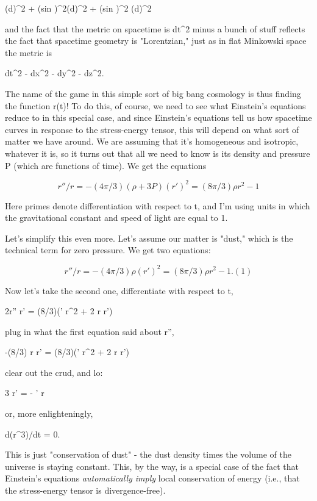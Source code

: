 (d\psi )^{2} + (sin \psi )^{2}{(d\theta )^{2} + (sin \theta )^{2} (d\phi )^{2}}

and the fact that the metric on spacetime is dt^{2} minus a bunch of stuff
reflects the fact that spacetime geometry is "Lorentzian," just as
in flat Minkowski space the metric is

dt^{2} - dx^{2} - dy^{2} - dz^{2}.

The name of the game in this simple sort of big bang cosmology is thus
finding the function r(t)!  To do this, of course, we need to see what
Einstein's equations reduce to in this special case, and since
Einstein's equations tell us how spacetime curves in response to the
stress-energy tensor, this will depend on what sort of matter we have
around.  We are assuming that it's homogeneous and isotropic, whatever
it is, so it turns out that all we need to know is its density \rho  and
pressure P (which are functions of time).  We get the equations


$$

r''/r = -(4\pi /3)(\rho  + 3P)              (r')^{2} = (8\pi /3) \rho  r^{2} - 1 
$$
    

Here primes denote differentiation with respect to t, and I'm using
units in which the gravitational constant and speed of light are equal to 1.

Let's simplify this even more.  Let's assume our matter is "dust," which
is the technical term for zero pressure.  We get two equations:


$$

r''/r = -(4\pi /3)\rho                (r')^{2} = (8\pi /3) \rho  r^{2} - 1.       (1)
$$
    

Now let's take the second one, differentiate with respect to t,

2r'' r' =  (8\pi /3)(\rho ' r^{2} + 2 \rho  r r')

plug in what the first equation said about r'',

-(8\pi /3) \rho  r r' = (8\pi /3)(\rho ' r^{2} + 2 \rho  r r')

clear out the crud, and lo:

3 \rho  r' =  - \rho ' r 

or, more enlighteningly,

d(\rho  r^{3})/dt = 0.

This is just "conservation of dust" - the dust density times the volume
of the universe is staying constant.  This, by the way, is a special
case of the fact that Einstein's equations \emph{automatically imply}
local conservation of energy (i.e., that the stress-energy tensor is
divergence-free).  

